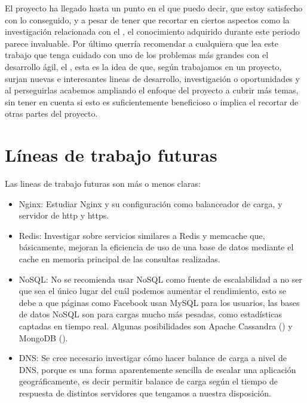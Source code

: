 El proyecto ha llegado hasta un punto en el que puedo decir, que estoy satisfecho con lo conseguido, y a pesar de tener que recortar en ciertos aspectos como la investigación relacionada con el , el conocimiento adquirido durante este periodo parece invaluable. Por último querría recomendar a cualquiera que lea este trabajo que tenga cuidado con uno de los problemas más grandes con el desarrollo ágil, el , esta es la idea de que, según trabajamos en un proyecto, surjan nuevas e interesantes lineas de desarrollo, investigación o oportunidades y al perseguirlas acabemos ampliando el enfoque del proyecto a cubrir más temas, sin tener en cuenta si esto es suficientemente beneficioso o implica el recortar de otras partes del proyecto.
 

\section{Líneas de trabajo futuras}
Las lineas de trabajo futuras son más o menos claras:

\begin{itemize}
\item Nginx: Estudiar Nginx y su configuración como balanceador de carga,  y servidor de http y https. 
\item Redis: Investigar sobre servicios similares a Redis y memcache que, básicamente, mejoran la eficiencia de uso de una base de datos mediante el cache en memoria principal de las consultas realizadas.
\item NoSQL: No se recomienda usar NoSQL como fuente de escalabilidad a no ser que sea el único lugar del cuál podemos aumentar el rendimiento, esto se debe a que páginas como Facebook usan MySQL para los usuarios, las bases de datos NoSQL son para cargas mucho más pesadas, como estadísticas captadas en tiempo real. Algunas posibilidades son Apache Cassandra () y MongoDB ().
\item DNS: Se cree necesario investigar cómo hacer balance de carga a nivel de DNS, porque es una forma aparentemente sencilla de escalar una aplicación geográficamente, es decir permitir balance de carga según el tiempo de respuesta de distintos servidores que tengamos a nuestra disposición.
\end{itemize}

